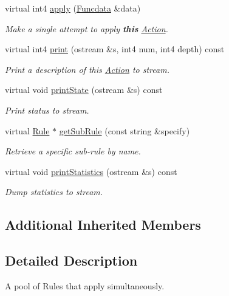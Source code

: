 \begin{DoxyCompactItemize}
virtual int4 \mbox{\hyperlink{class_action_pool_ad7b2ba46cad39369c0831cbfcc654802}{apply}} (\mbox{\hyperlink{class_funcdata}{Funcdata}} \&data)
\begin{DoxyCompactList}\small\item\em Make a single attempt to apply {\bfseries{this}} \mbox{\hyperlink{class_action}{Action}}. \end{DoxyCompactList}\item 
virtual int4 \mbox{\hyperlink{class_action_pool_a543411d736e1a5766a74fe30b65efdd8}{print}} (ostream \&s, int4 num, int4 depth) const
\begin{DoxyCompactList}\small\item\em Print a description of this \mbox{\hyperlink{class_action}{Action}} to stream. \end{DoxyCompactList}\item 
virtual void \mbox{\hyperlink{class_action_pool_ac3301606be4afd36584109196c71e2ed}{print\+State}} (ostream \&s) const
\begin{DoxyCompactList}\small\item\em Print status to stream. \end{DoxyCompactList}\item 
virtual \mbox{\hyperlink{class_rule}{Rule}} $\ast$ \mbox{\hyperlink{class_action_pool_ab3fa9090810784f45c832c641947fb2e}{get\+Sub\+Rule}} (const string \&specify)
\begin{DoxyCompactList}\small\item\em Retrieve a specific sub-\/rule by name. \end{DoxyCompactList}\item 
virtual void \mbox{\hyperlink{class_action_pool_aed2073462c2dc9a3c33a6720f9cfc93b}{print\+Statistics}} (ostream \&s) const
\begin{DoxyCompactList}\small\item\em Dump statistics to stream. \end{DoxyCompactList}\end{DoxyCompactItemize}
\subsection*{Additional Inherited Members}


\subsection{Detailed Description}
A pool of Rules that apply simultaneously. 

